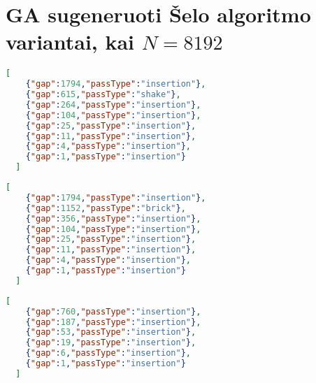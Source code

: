 \documentclass{VUMIFInfBakalaurinis}
\begin{document}
\section{GA sugeneruoti Šelo algoritmo variantai, kai $N = 8192$}

\begin{lstlisting}[caption={Algoritmas C1},label={alg:C1},language=json]
  [
    {"gap":1794,"passType":"insertion"}, 
    {"gap":615,"passType":"shake"}, 
    {"gap":264,"passType":"insertion"}, 
    {"gap":104,"passType":"insertion"}, 
    {"gap":25,"passType":"insertion"}, 
    {"gap":11,"passType":"insertion"}, 
    {"gap":4,"passType":"insertion"}, 
    {"gap":1,"passType":"insertion"}
  ]
\end{lstlisting}

\begin{lstlisting}[caption={Algoritmas C2},label={alg:C2},language=json]
  [
    {"gap":1794,"passType":"insertion"}, 
    {"gap":1152,"passType":"brick"}, 
    {"gap":356,"passType":"insertion"}, 
    {"gap":104,"passType":"insertion"}, 
    {"gap":25,"passType":"insertion"}, 
    {"gap":11,"passType":"insertion"}, 
    {"gap":4,"passType":"insertion"}, 
    {"gap":1,"passType":"insertion"}
  ]
\end{lstlisting}

\begin{lstlisting}[caption={Algoritmas C3},label={alg:C3},language=json]
  [
    {"gap":760,"passType":"insertion"}, 
    {"gap":187,"passType":"insertion"}, 
    {"gap":53,"passType":"insertion"}, 
    {"gap":19,"passType":"insertion"}, 
    {"gap":6,"passType":"insertion"}, 
    {"gap":1,"passType":"insertion"}
  ]
\end{lstlisting}
\end{document}
